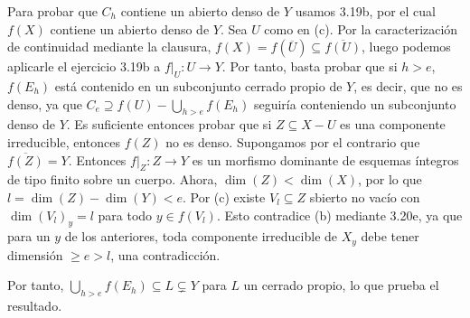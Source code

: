 \documentclass[twoside]{article}
\begin{document}
\begin{solucion}
\begin{enumerate}[(a)]
Para probar que $C_h$ contiene un abierto denso de $Y$ usamos 3.19b, por el cual $f(X)$ contiene un abierto denso de $Y$. Sea $U$ como en (c). Por la caracterización de continuidad mediante la clausura, $f(X)=f(\overline{U})\subseteq \overline{f(U)}$, luego podemos aplicarle el ejercicio 3.19b a $f|_U:U\to Y$. Por tanto, basta probar que si $h>e$, $f(E_h)$ está contenido en un subconjunto cerrado propio de $Y$, es decir, que no es denso, ya que $C_e\supseteq f(U)-\bigcup_{h>e}f(E_h)$ seguiría conteniendo un subconjunto denso de $Y$. Es suficiente entonces probar que si $Z\subseteq X-U$ es una componente irreducible, entonces $f(Z)$ no es denso. Supongamos por el contrario que $\overline{f(Z)}=Y$. Entonces $f|_Z:Z\to Y$ es un morfismo dominante de esquemas íntegros de tipo finito sobre un cuerpo. Ahora, $\dim(Z)<\dim(X)$, por lo que $l=\dim(Z)-\dim(Y)<e$. Por (c) existe $V_l\subseteq Z$ sbierto no vacío con $\dim(V_l)_y=l$ para todo $y\in f(V_l)$. Esto contradice (b) mediante 3.20e, ya que para un $y$ de los anteriores, toda componente irreducible de $X_y$ debe tener dimensión $\geq e>l$, una contradicción.

Por tanto, $\bigcup_{h>e}f(E_h)\subseteq L\subsetneq Y$ para $L$ un cerrado propio, lo que prueba el resultado. 


\end{enumerate}
%
%
%




\end{solucion}
\end{document}
